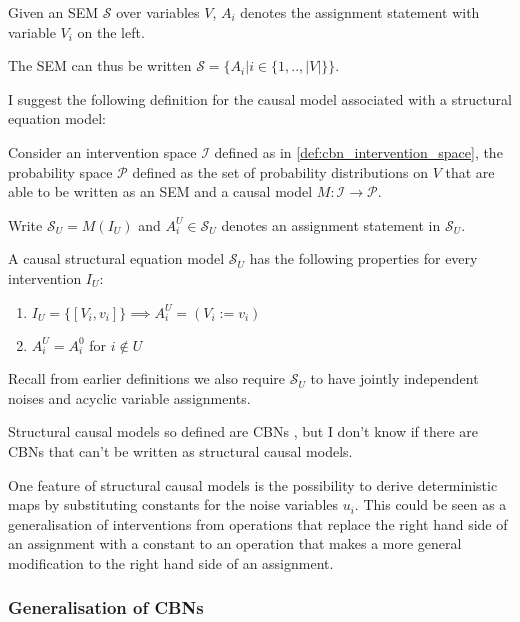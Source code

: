 \begin{definition}
Given an SEM $\mathcal{S}$ over variables $V$, $A_i$ denotes the assignment statement with variable $V_i$ on the left.

The SEM can thus be written $\mathcal{S}=\{A_i|i\in\{1,..,|V|\}\}$.
\end{definition}

I suggest the following definition for the causal model associated with a structural equation model:

\begin{definition}
Consider an intervention space $\mathcal{I}$ defined as in \ref{def:cbn_intervention_space}, the probability space $\mathcal{P}$ defined as the set of probability distributions on $V$ that are able to be written as an SEM and a causal model $M:\mathcal{I}\to\mathcal{P}$.

Write $\mathcal{S}_U=M(I_U)$ and $A_i^U\in\mathcal{S}_U$ denotes an assignment statement in $\mathcal{S}_U$.

A causal structural equation model $\mathcal{S}_U$ has the following properties for every intervention $I_U$:
\begin{enumerate}
    \item $I_U=\{[V_i,v_i]\}\implies A_i^U=(V_i:=v_i)$
    \item $A_i^U=A_i^0$ for $i\not\in U$
\end{enumerate}
Recall from earlier definitions we also require $\mathcal{S}_U$ to have jointly independent noises and acyclic variable assignments.

\end{definition}

Structural causal models so defined are CBNs \cite{pearl_causality:_2009}, but I don't know if there are CBNs that can't be written as structural causal models.

One feature of structural causal models is the possibility to derive deterministic maps by substituting constants for the noise variables $u_i$. This could be seen as a generalisation of interventions from operations that replace the right hand side of an assignment with a constant to an operation that makes a more general modification to the right hand side of an assignment.


\subsubsection{Generalisation of CBNs}

